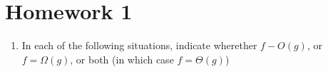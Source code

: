 \documentclass[a4paper,12pt]{article}
\begin{document}
\section*{Homework 1}

\begin{enumerate}
    \item In each of the following situations, indicate wherether $f - O(g)$, or $f = \Omega(g)$, or both (in which case $f = \Theta(g)$)
\end{enumerate}
\end{document}
